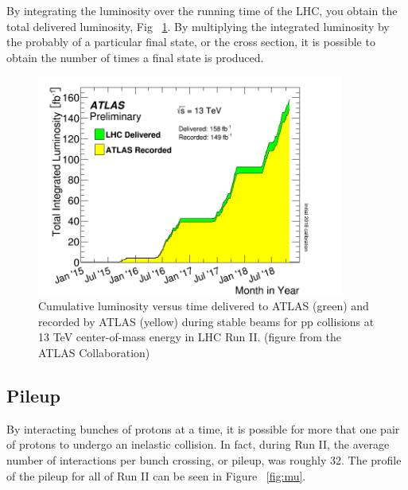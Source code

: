 \indent By integrating the luminosity over the running time of the LHC, you obtain the total delivered luminosity, Fig ~\ref{fig:lumi}. By multiplying the integrated luminosity by the probably of a particular final state, or the cross section, it is possible to obtain the number of times a final state is produced.\newline

\begin{figure}[H]
\begin{center}
\includegraphics*[width=0.90\textwidth] {figures/intlumivstimeRun2}%
\caption[Integrated Luminosity]{Cumulative luminosity versus time delivered to ATLAS (green) and recorded by ATLAS (yellow) during stable beams for pp collisions at 13 TeV center-of-mass energy in LHC Run II.  (figure from the ATLAS Collaboration)}
\label{fig:lumi}
\end{center}
\end{figure}

\subsection{Pileup}
\indent By interacting bunches of protons at a time, it is possible for more that one pair of protons to undergo an inelastic collision. In fact, during Run II,  the average number of interactions per bunch crossing, or pileup, was roughly 32. The profile of the pileup for all of Run II can be seen in Figure ~\ref{fig:mu}. 

